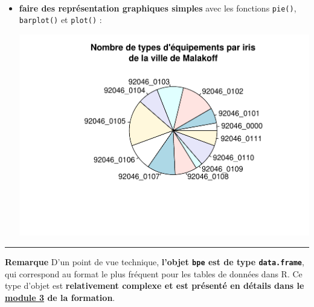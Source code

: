\documentclass[12pt,twosided, notitlepage]{book}
\newenvironment{Shaded}{}{}
\newcommand{\CharTok}[1]{\textcolor[rgb]{0.00,0.50,0.50}{#1}}
\newcommand{\CommentTok}[1]{\textcolor[rgb]{0.00,0.50,0.00}{#1}}
\newcommand{\DataTypeTok}[1]{#1}
\newcommand{\KeywordTok}[1]{\textcolor[rgb]{0.00,0.00,1.00}{#1}}
\newcommand{\NormalTok}[1]{#1}
\newcommand{\OperatorTok}[1]{#1}
\newcommand{\StringTok}[1]{\textcolor[rgb]{0.00,0.50,0.50}{#1}}
\renewenvironment{Shaded}{\begin{snugshade}}{\end{snugshade}}
\begin{document}
~

\begin{itemize}
\item
  \textbf{faire des représentation graphiques simples} avec les
  fonctions \texttt{pie()},
  \texttt{barplot()} et
  \texttt{plot()} :

\begin{Shaded}
\end{Shaded}

  \begin{center}\includegraphics{livret_files/figure-latex/bpe_pie-1} \end{center}
\end{itemize}

\begin{center}\rule{0.5\linewidth}{\linethickness}\end{center}

\textbf{Remarque} D'un point de vue technique, \textbf{l'objet
\texttt{bpe} est de type \texttt{data.frame}}, qui correspond au format
le plus fréquent pour les tables de données dans R. Ce type d'objet est
\textbf{relativement complexe et est présenté en détails dans le
\underline{module 3} de la formation}.
\end{document}
